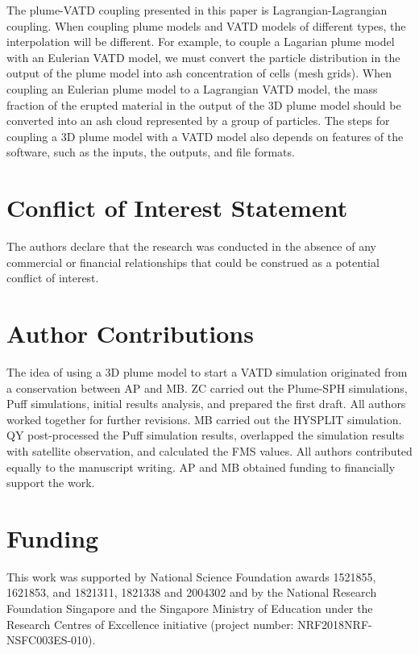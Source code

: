 \documentclass[utf8]{frontiersSCNS} %
\begin{document}
The plume-VATD coupling presented in this paper is
Lagrangian-Lagrangian coupling. When coupling plume models and VATD
models of different types, the interpolation will be different. For
example, to couple a Lagarian plume model with an Eulerian VATD model,
we must convert the particle distribution in the output of the plume
model into ash concentration of cells (mesh grids). When coupling an
Eulerian plume model to a Lagrangian VATD model, the mass fraction of
the erupted material in the output of the 3D plume model should be
converted into an ash cloud represented by a group of particles. The
steps for coupling a 3D plume model with a VATD model also depends on
features of the software, such as the inputs, the outputs, and file
formats.

\section*{Conflict of Interest Statement}

The authors declare that the research was conducted in the absence of any commercial or financial relationships that could be construed as a potential conflict of interest.

\section*{Author Contributions}
The idea of using a 3D plume model to start a VATD simulation originated from a conservation between AP and MB. ZC carried out the Plume-SPH simulations, Puff simulations, initial results analysis, and prepared the first draft. All authors worked together for further revisions.  MB carried out the HYSPLIT simulation. QY post-processed the Puff simulation results, overlapped the simulation results with satellite observation, and calculated the FMS values. All authors contributed equally to the manuscript writing. AP and MB obtained funding to financially support the work.

\section*{Funding}
This work was supported by National Science Foundation awards 1521855, 1621853, and 1821311, 1821338  and 2004302 and by the National Research Foundation Singapore and the Singapore Ministry of Education under the Research Centres of Excellence initiative (project number: NRF2018NRF-NSFC003ES-010). 
\end{document}

